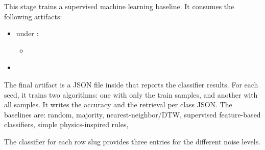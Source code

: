 \documentclass[11pt]{article}
\begin{document}
\label{docstart:rf_stage}

This stage trains a supervised machine learning baseline. It consumes the following artifacts:
\begin{itemize}
\item under :
  \begin{itemize}
  \item {}
  \end{itemize}
\end{itemize}

\begin{itemize}
\item {}
\end{itemize}

The final artifact is a JSON file inside  that reports the classifier results.
For each seed, it trains two algorithms: one with only the train samples, and another with all samples. It writes the accuracy and the retrieval per class JSON.
The baselines are:
random, majority, nearest-neighbor/DTW, supervised feature-based classifiers, simple physics-inspired rules, 

The classifier for each row slug provides three entries for the different noise levels.
\end{document}
